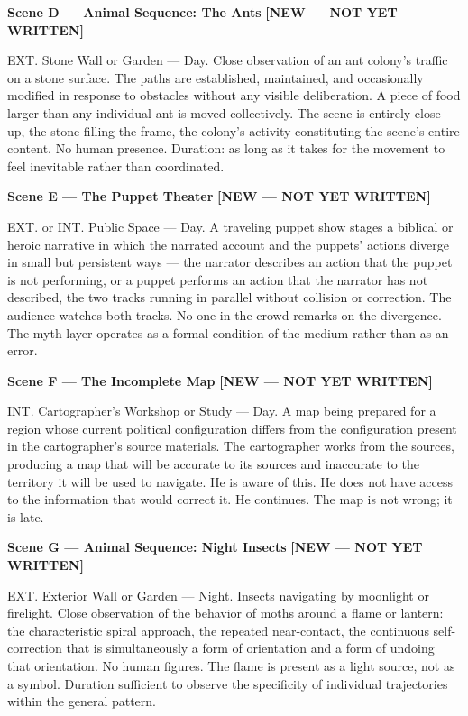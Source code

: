 \documentclass[12pt, oneside]{amsart}
\newcommand{\statusnew}{{\small\bfseries\color{newscene}[NEW --- NOT YET WRITTEN]}}
\begin{document}
\bigskip

\noindent\textbf{Scene D --- Animal Sequence: The Ants} \statusnew

\noindent EXT. Stone Wall or Garden --- Day. Close observation of an ant colony's traffic on a stone surface. The paths are established, maintained, and occasionally modified in response to obstacles without any visible deliberation. A piece of food larger than any individual ant is moved collectively. The scene is entirely close-up, the stone filling the frame, the colony's activity constituting the scene's entire content. No human presence. Duration: as long as it takes for the movement to feel inevitable rather than coordinated.

\bigskip

\noindent\textbf{Scene E --- The Puppet Theater} \statusnew

\noindent EXT. or INT. Public Space --- Day. A traveling puppet show stages a biblical or heroic narrative in which the narrated account and the puppets' actions diverge in small but persistent ways --- the narrator describes an action that the puppet is not performing, or a puppet performs an action that the narrator has not described, the two tracks running in parallel without collision or correction. The audience watches both tracks. No one in the crowd remarks on the divergence. The myth layer operates as a formal condition of the medium rather than as an error.

\bigskip

\noindent\textbf{Scene F --- The Incomplete Map} \statusnew

\noindent INT. Cartographer's Workshop or Study --- Day. A map being prepared for a region whose current political configuration differs from the configuration present in the cartographer's source materials. The cartographer works from the sources, producing a map that will be accurate to its sources and inaccurate to the territory it will be used to navigate. He is aware of this. He does not have access to the information that would correct it. He continues. The map is not wrong; it is late.

\bigskip

\noindent\textbf{Scene G --- Animal Sequence: Night Insects} \statusnew

\noindent EXT. Exterior Wall or Garden --- Night. Insects navigating by moonlight or firelight. Close observation of the behavior of moths around a flame or lantern: the characteristic spiral approach, the repeated near-contact, the continuous self-correction that is simultaneously a form of orientation and a form of undoing that orientation. No human figures. The flame is present as a light source, not as a symbol. Duration sufficient to observe the specificity of individual trajectories within the general pattern.
\end{document}
